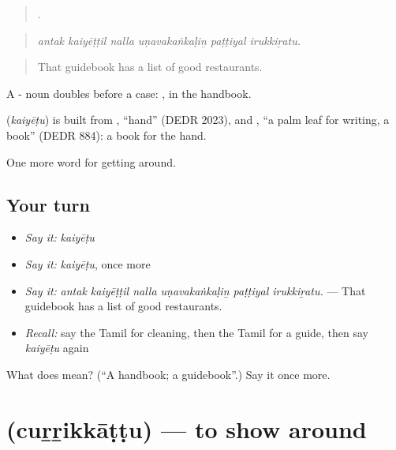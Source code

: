 \begin{quote}
     .
\end{quote}

\begin{quote}
\emph{antak kaiyēṭṭil nalla uṇavakaṅkaḷiṉ paṭṭiyal irukkiṟatu.}
\end{quote}

\begin{quote}
That guidebook has a list of good restaurants.
\end{quote}

A - noun doubles before a case: , in the handbook.

\begin{cousinweb}
\textbf{} (\emph{kaiyēṭu}) is built from , \textquotedblleft{}hand\textquotedblright{} (DEDR 2023), and , \textquotedblleft{}a palm leaf for writing, a book\textquotedblright{} (DEDR 884): a book for the hand.
\end{cousinweb}

\begin{grammarlens}[title={What you've built}]
One more word for getting around.
\end{grammarlens}

\subsection*{Your turn}
\begin{itemize}
\raggedright
  \item \emph{Say it:} \emph{kaiyēṭu}
  \item \emph{Say it:} \emph{kaiyēṭu}, once more
  \item \emph{Say it:} \emph{antak kaiyēṭṭil nalla uṇavakaṅkaḷiṉ paṭṭiyal irukkiṟatu.} — That guidebook has a list of good restaurants.
  \item \emph{Recall:} say the Tamil for cleaning, then the Tamil for a guide, then say \emph{kaiyēṭu} again
\end{itemize}

\begin{tcolorbox}[breakable,colback=teal!4,colframe=teal!35!black,title={Before you move on}]
What does  mean? (\textquotedblleft{}A handbook; a guidebook\textquotedblright{}.) Say it once more.
\end{tcolorbox}
\section[\texorpdfstring{\ta{சுற்றிக்காட்டு} (cuṟṟikkāṭṭu)}{சுற்றிக்காட்டு (cuṟṟikkāṭṭu)}]{ (cuṟṟikkāṭṭu) — to show around}

